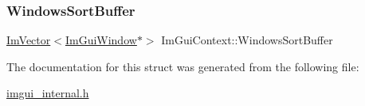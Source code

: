 \mbox{\label{struct_im_gui_context_af33de778de28b057fa7a42e4cbe0017a}} 
\subsubsection{\texorpdfstring{Windows\+Sort\+Buffer}{WindowsSortBuffer}}
{\footnotesize\ttfamily \mbox{\hyperlink{class_im_vector}{Im\+Vector}}$<$\mbox{\hyperlink{struct_im_gui_window}{Im\+Gui\+Window}}$\ast$$>$ Im\+Gui\+Context\+::\+Windows\+Sort\+Buffer}



The documentation for this struct was generated from the following file\+:\begin{DoxyCompactItemize}
\item 
\mbox{\hyperlink{imgui__internal_8h}{imgui\+\_\+internal.\+h}}\end{DoxyCompactItemize}

